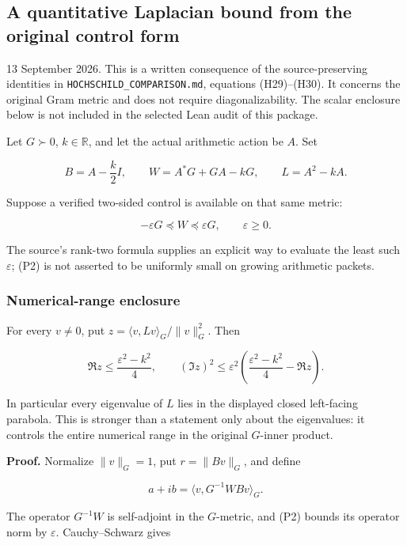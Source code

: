 \subsection{A quantitative Laplacian bound from the original control form}\label{endpoint-cc_laplacian--a-quantitative-laplacian-bound-from-the-original-control-form}

13 September 2026. This is a written consequence of the source-preserving identities in \nolinkurl{HOCHSCHILD_COMPARISON.md}, equations (H29)--(H30). It concerns the original Gram metric and does not require diagonalizability. The scalar enclosure below is not included in the selected Lean audit of this package.

Let \(G\succ0\), \(k\in\mathbb R\), and let the actual arithmetic action be \(A\). Set

\[
B=A-\frac{k}{2}I,\qquad W=A^*G+GA-kG,\qquad L=A^2-kA.
\tag{P1}
\]

Suppose a verified two-sided control is available on that same metric:

\[
-\varepsilon G\preceq W\preceq\varepsilon G,\qquad\varepsilon\ge0.
\tag{P2}
\]

The source's rank-two formula supplies an explicit way to evaluate the least such \(\varepsilon\); (P2) is not asserted to be uniformly small on growing arithmetic packets.

\subsubsection{Numerical-range enclosure}\label{endpoint-cc_laplacian--numerical-range-enclosure}

For every \(v\ne0\), put \(z=\langle v,Lv\rangle_G/\|v\|_G^2\). Then

\[
\boxed{\Re z\le\frac{\varepsilon^2-k^2}{4},\qquad
(\Im z)^2\le\varepsilon^2\left(\frac{\varepsilon^2-k^2}{4}-\Re z\right).}
\tag{P3}
\]

In particular every eigenvalue of \(L\) lies in the displayed closed left-facing parabola. This is stronger than a statement only about the eigenvalues: it controls the entire numerical range in the original \(G\)-inner product.

\textbf{Proof.} Normalize \(\|v\|_G=1\), put \(r=\|Bv\|_G\), and define

\[
a+ib=\langle v,G^{-1}WBv\rangle_G.
\tag{P4}
\]

The operator \(G^{-1}W\) is self-adjoint in the \(G\)-metric, and (P2) bounds its operator norm by \(\varepsilon\). Cauchy--Schwarz gives

